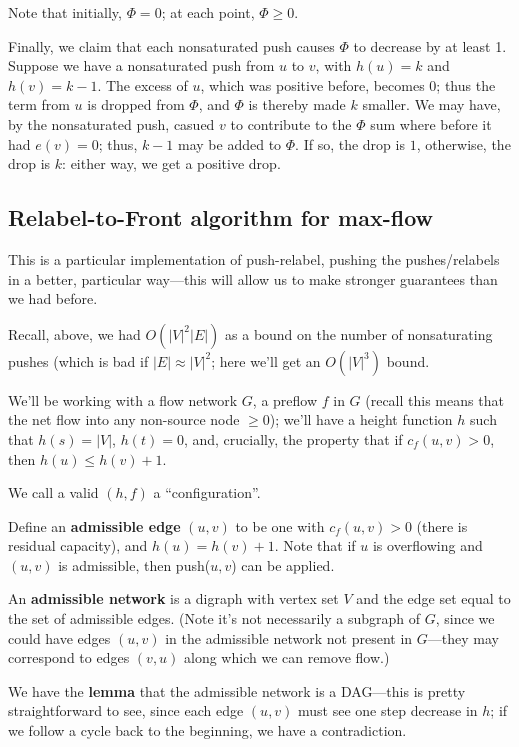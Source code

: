 \documentclass{article}
\begin{document}
Note that
initially, $\Phi = 0$; at each point, $\Phi \geq 0$.

Finally, we claim that each nonsaturated push causes $\Phi$ to 
decrease by at least 1.
Suppose we have a nonsaturated push from $u$ to $v$, with $h(u) = k$ and
$h(v) = k-1$.
The excess of $u$, which was positive before, becomes 0; thus the term
from $u$ is dropped from $\Phi$, and $\Phi$ is thereby made $k$ smaller.
We may have, by the nonsaturated push, casued $v$ to contribute to the
$\Phi$ sum where before it had $e(v) = 0$; thus, $k-1$ may be added to
$\Phi$. If so, the drop is $1$, otherwise, the drop is $k$: either way,
we get a positive drop.






\subsection{Relabel-to-Front algorithm for max-flow}

This is a particular implementation of push-relabel, pushing the
pushes/relabels in a better, particular way---this will allow us to make
stronger guarantees than we had before.

Recall, above, we had $O(|V|^2|E|)$ as a bound on the number of
nonsaturating pushes (which is bad if $|E|\approx|V|^2$; here we'll
get an $O(|V|^3)$ bound.


We'll be working with a flow network $G$, a preflow $f$ in $G$ 
(recall this means that the net flow into any non-source node $\geq 0$);
we'll have a height function $h$ such that $h(s) = |V|$, $h(t)= 0$, and,
crucially, the property that if $c_f(u,v) > 0$, then $h(u) \leq h(v) + 1$.

We call a valid $(h,f)$ a ``configuration''.

Define an \textbf{admissible edge} $(u,v)$ to be one with
$c_f(u,v) > 0$ (there is residual capacity), and $h(u) = h(v) + 1$.
Note that if $u$ is overflowing and $(u, v)$ is admissible, then
push($u,v$) can be applied.

An \textbf{admissible network} is a digraph with vertex set $V$ and the
edge set equal to the set of admissible edges.
(Note it's not necessarily a subgraph of $G$, since we could have edges $(u,v)$
in the admissible network not present in $G$---they may correspond to edges
$(v,u)$ along which we can remove flow.)

We have the \textbf{lemma} that the admissible network is a DAG---this is
pretty straightforward to see, since each edge $(u,v)$ must see one step
decrease in $h$; if we follow a cycle back to the beginning, we have a 
contradiction.
\end{document}
